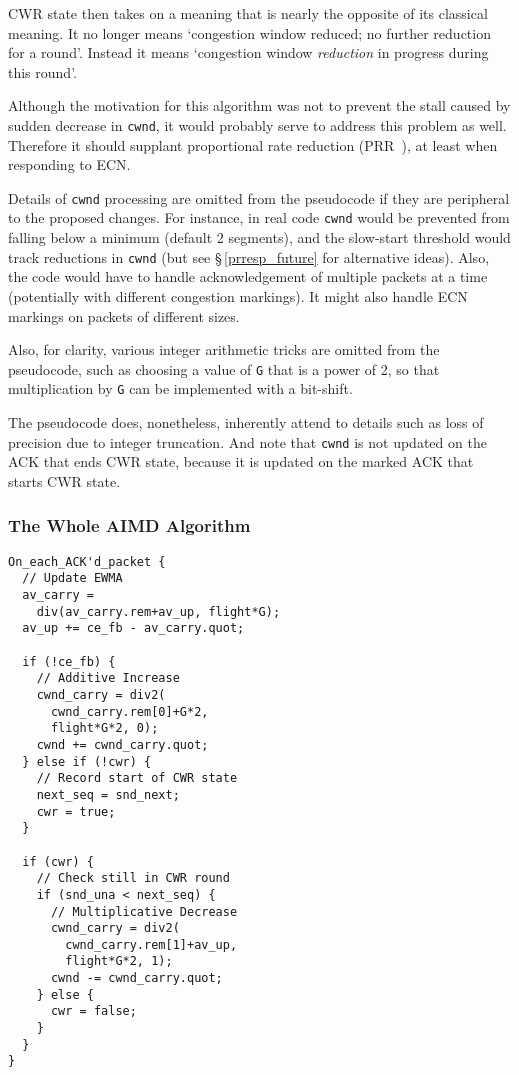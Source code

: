 CWR state then takes on a meaning that is nearly the opposite of its classical
meaning. It no longer means `congestion window reduced; no further reduction for
a round'. Instead it means `congestion window \emph{reduction} in progress
during this round'. 

Although the motivation for this algorithm was not to prevent the stall caused
by sudden decrease in \texttt{cwnd}, it would probably serve to address this
problem as well. Therefore it should supplant proportional rate reduction
(PRR~\cite{IETF_RFC6937:PRR}), at least when responding to ECN.

Details of \texttt{cwnd} processing are omitted from the pseudocode if they are
peripheral to the proposed changes. For instance, in real code \texttt{cwnd}
would be prevented from falling below a minimum (default 2 segments), and the
slow-start threshold would track reductions in \texttt{cwnd} (but see
\S\,\ref{prresp_future} for alternative ideas). Also, the code would have to
handle acknowledgement of multiple packets at a time (potentially with different
congestion markings). It might also handle ECN markings on packets of different
sizes.

Also, for clarity, various integer arithmetic tricks are omitted from the
pseudocode, such as choosing a value of \texttt{G} that is a power of 2, so that
multiplication by \texttt{G} can be implemented with a bit-shift.

The pseudocode does, nonetheless, inherently attend to details such as loss of
precision due to integer truncation. And note that \texttt{cwnd} is not updated
on the ACK that ends CWR state, because it is updated on the marked ACK that
starts CWR state.

\subsubsection{The Whole AIMD Algorithm}\label{prresp_AIMD}

\begin{verbatim}
On_each_ACK'd_packet {
  // Update EWMA
  av_carry = 
    div(av_carry.rem+av_up, flight*G);
  av_up += ce_fb - av_carry.quot;

  if (!ce_fb) {
    // Additive Increase
    cwnd_carry = div2(
      cwnd_carry.rem[0]+G*2, 
      flight*G*2, 0);
    cwnd += cwnd_carry.quot;
  } else if (!cwr) {
    // Record start of CWR state
    next_seq = snd_next;
    cwr = true;
  }

  if (cwr) {
    // Check still in CWR round
    if (snd_una < next_seq) {
      // Multiplicative Decrease
      cwnd_carry = div2(
        cwnd_carry.rem[1]+av_up, 
        flight*G*2, 1);
      cwnd -= cwnd_carry.quot;
    } else {
      cwr = false;
    }
  }
}
\end{verbatim}

